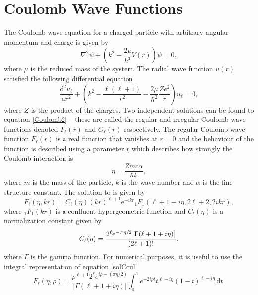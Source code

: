\section{Coulomb Wave Functions}\label{sec:Coulomb}
The Coulomb wave equation for a charged particle with arbitrary angular momentum and charge is given by 
\begin{equation} \label{Coulomb1}
	\nabla^2\psi +\left( k^2-\frac{2\mu}{\hbar^2}V(r)\right)\psi = 0,
\end{equation}
where $\mu$ is the reduced mass of the system. The radial wave function $u(r)$ satisfied the following differential equation
\begin{equation} \label{Coulomb2}
	\frac{\text{d}^2 u_\ell}{\text{d}r^2}+\left( k^2-\frac{\ell(\ell+1)}{r^2}-\frac{2\mu}{\hbar^2}\frac{Ze^2}{r}\right)u_\ell=0,
\end{equation}
where $Z$ is the product of the charges. Two independent solutions can be found to equation \eqref{Coulomb2} -- these are called the regular and irregular Coulomb wave functions denoted $F_\ell(r)$ and $G_\ell(r)$ respectively. The regular Coulomb wave function $F_\ell(r)$ is a real function that vanishes at $r=0$ and the behaviour of the function is described using a parameter $\eta$ which describes how strongly the Coulomb interaction is
\begin{equation} \label{etafactor}
	\eta = \frac{Zmc\alpha }{\hbar k},
\end{equation}
where $m$ is the mass of the particle, $k$ is the wave number and $\alpha$ is the fine structure constant. The solution to is given by
\begin{equation} \label{solCoul}
	F_\ell(\eta,kr) = C_\ell (\eta) (kr)^{\ell+1}\text{e}^{-ikr}  {}_1 F_1(\ell+1-i\eta,2\ell+2,2ikr),
\end{equation}
where ${}_1F_1(kr)$ is a confluent hypergeometric function and $C_\ell(\eta)$ is a normalization constant given by 
\begin{equation} \label{normalization}
	C_\ell(\eta) = \frac{2^\ell \text{e}^{-\pi\eta/2}\abs{\Gamma(\ell+1+i\eta)}}{(2\ell+1)!},
\end{equation}
where $\Gamma$ is the gamma function. For numerical purposes, it is useful to use the integral representation of equation \eqref{solCoul} \cite[eq. 33.7.1]{NIST} 
\begin{equation} \label{integralrep}
	F_\ell(\eta,\rho) = \frac{\rho^{\ell+1}2^\ell e^{i\rho-(\pi\eta/2)}}{|\Gamma(\ell+1+i\eta)|} \int_0^1 e^{-2i\rho t}t^{\ell+i\eta}(1-t)^{\ell-i\eta} \, \text{d}t.
\end{equation}

